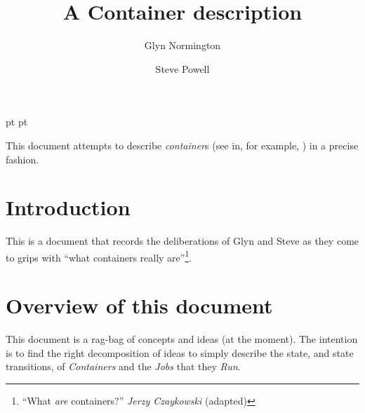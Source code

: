 \documentclass[a4paper,twoside,12pt]{article}
\begin{document}
 pt
 pt

\def\Slash{\slash\hspace{0pt}}

\title{A Container description}

\author{
Glyn Normington\and
Steve Powell
}

\maketitle
\thispagestyle{empty}
\setcounter{page}{1}


This document attempts to describe \emph{container}s (see in, for example, \cite{garden}) in a precise fashion.


\newcommand{\true}{true}
\newcommand{\false}{false}
\renewcommand{\emptyset}{\varnothing}

\clearpage
\tableofcontents

\cleardoublepage
{}
\setcounter{page}{1}

\section{Introduction}

This is a document that records the deliberations of Glyn and Steve as they come to grips with ``what containers really
are''\footnote{``What \emph{are} containers?'' \emph{Jerzy Czaykowski} (adapted)}.

\section{Overview of this document}

This document is a rag-bag of concepts and ideas (at the moment). The intention is to find the right decomposition of ideas to simply describe the state, and state transitions, of \emph{Containers} and the \emph{Jobs} that they \emph{Run}.
\end{document}
